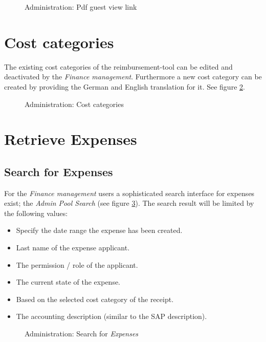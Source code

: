 \begin{figure}[H]
    \centering
    \caption{Administration: Pdf guest view link}
    \label{fig:pdf-web}
\end{figure}

\section{Cost categories}

The existing cost categories of the reimbursement-tool can be edited and deactivated by the \textit{Finance management}. Furthermore a new cost category can be created by providing the German and English translation for it. See figure \ref{fig:admin-costcategories}.

\begin{figure}[H]
    \centering
    \caption{Administration: Cost categories}
    \label{fig:admin-costcategories}
\end{figure}

\section{Retrieve Expenses}
\subsection{Search for Expenses}

For the \textit{Finance management} users a sophisticated search interface for expenses exist; the \textit{Admin Pool Search} (see figure \ref{fig:admin-search}). The search result will be limited by the following values:

\begin{itemize}
    \item Specify the date range the expense has been created.
    \item Last name of the expense applicant.
    \item The permission / role of the applicant.
    \item The current state of the expense.
    \item Based on the selected cost category of the receipt.
    \item The accounting description (similar to the SAP description).
\end{itemize}

\begin{figure}[H]
    \centering
    \caption{Administration: Search for \textit{Expenses}}
    \label{fig:admin-search}
\end{figure}

